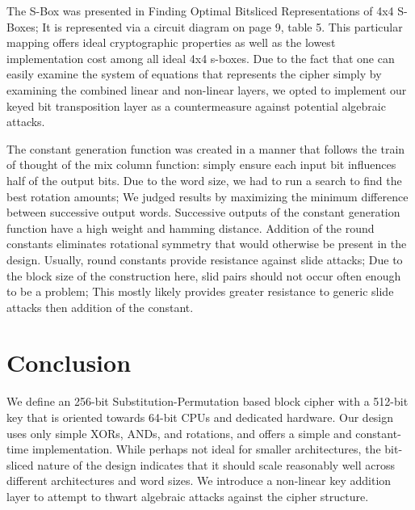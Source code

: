 \documentclass[preprint]{iacrtrans}
\begin{document}
The S-Box was presented in Finding Optimal Bitsliced Representations of 4x4 S-Boxes; It is represented via a circuit diagram on page 9, table 5. This particular mapping offers ideal cryptographic properties as well as the lowest implementation cost among all ideal 4x4 s-boxes. Due to the fact that one can easily examine the system of equations that represents the cipher simply by examining the combined linear and non-linear layers, we opted to implement our keyed bit transposition layer as a countermeasure against potential algebraic attacks. 

The constant generation function was created in a manner that follows the train of thought of the mix column function: simply ensure each input bit influences half of the output bits. Due to the word size, we had to run a search to find the best rotation amounts; We judged results by maximizing the minimum difference between successive output words. Successive outputs of the constant generation function have a high weight and hamming distance. Addition of the round constants eliminates rotational symmetry that would otherwise be present in the design. Usually, round constants provide resistance against slide attacks; Due to the block size of the construction here, slid pairs should not occur often enough to be a problem; This mostly likely provides greater resistance to generic slide attacks then addition of the constant.


\section{Conclusion}
 We define an 256-bit Substitution-Permutation based block cipher with a 512-bit key that is oriented towards 64-bit CPUs and dedicated hardware. Our design uses only simple XORs, ANDs, and rotations, and offers a simple and constant-time implementation. While perhaps not ideal for smaller architectures, the bit-sliced nature of the design indicates that it should scale reasonably well across different architectures and word sizes. We introduce a non-linear key addition layer to attempt to thwart algebraic attacks against the cipher structure.
\end{document}
